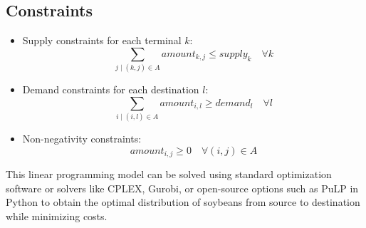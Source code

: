 \documentclass{article}
\begin{document}
\subsection*{Constraints}
\begin{itemize}
    \item Supply constraints for each terminal \( k \):
    \[
    \sum_{j \mid (k,j) \in A} amount_{k,j} \leq supply_{k} \quad \forall k
    \]
    \item Demand constraints for each destination \( l \):
    \[
    \sum_{i \mid (i,l) \in A} amount_{i,l} \geq demand_{l} \quad \forall l
    \]
    \item Non-negativity constraints:
    \[
    amount_{i,j} \geq 0 \quad \forall (i,j) \in A
    \]
\end{itemize}

This linear programming model can be solved using standard optimization software or solvers like CPLEX, Gurobi, or open-source options such as PuLP in Python to obtain the optimal distribution of soybeans from source to destination while minimizing costs.
\end{document}

